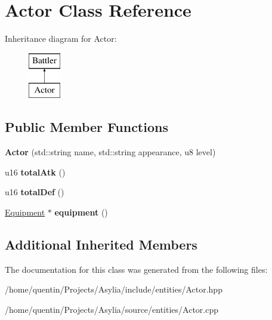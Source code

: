 \hypertarget{classActor}{\section{Actor Class Reference}
\label{classActor}
}
Inheritance diagram for Actor\-:\begin{figure}[H]
\begin{center}
\leavevmode
\includegraphics[height=2.000000cm]{classActor}
\end{center}
\end{figure}
\subsection*{Public Member Functions}
\begin{DoxyCompactItemize}
\item 
\hypertarget{classActor_ad798fd68e9d080201facb0e497fac994}{{\bfseries Actor} (std\-::string name, std\-::string appearance, u8 level)}\label{classActor_ad798fd68e9d080201facb0e497fac994}

\item 
\hypertarget{classActor_a284d982f35bc080b5893a1a13d54ca32}{u16 {\bfseries total\-Atk} ()}\label{classActor_a284d982f35bc080b5893a1a13d54ca32}

\item 
\hypertarget{classActor_af59a0165a200c79d463ffe25eb8e6623}{u16 {\bfseries total\-Def} ()}\label{classActor_af59a0165a200c79d463ffe25eb8e6623}

\item 
\hypertarget{classActor_a9d2f1351d7cb086cf5dc62deca40c76b}{\hyperlink{classEquipment}{Equipment} $\ast$ {\bfseries equipment} ()}\label{classActor_a9d2f1351d7cb086cf5dc62deca40c76b}

\end{DoxyCompactItemize}
\subsection*{Additional Inherited Members}


The documentation for this class was generated from the following files\-:\begin{DoxyCompactItemize}
\item 
/home/quentin/\-Projects/\-Asylia/include/entities/Actor.\-hpp\item 
/home/quentin/\-Projects/\-Asylia/source/entities/Actor.\-cpp\end{DoxyCompactItemize}
